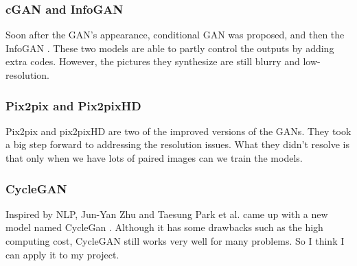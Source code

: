 \documentclass{article}
\begin{document}
\subsubsection{cGAN and InfoGAN}
\indent Soon after the GAN's appearance, conditional GAN \cite{Mirza2014Conditional} was proposed, and then the InfoGAN \cite{Chen2016InfoGAN}. These two models are able to partly control the outputs by adding extra codes. However, the pictures they synthesize are still blurry and low-resolution.


\subsubsection{Pix2pix and Pix2pixHD}
\indent Pix2pix \cite{Isola2017Image} and pix2pixHD \cite{pix2pixHD} are two of the improved versions of the GANs. They took a big step forward to addressing the resolution issues. What they didn't resolve is that only when we have lots of paired images can we train the models.

\subsubsection{CycleGAN}
\indent Inspired by NLP, Jun-Yan Zhu and Taesung Park et al. came up with a new model named CycleGan \cite{Zhu2017Unpaired}. Although it has some drawbacks such as the high computing cost, CycleGAN still works very well for many problems. So I think I can apply it to my project.
\end{document}
